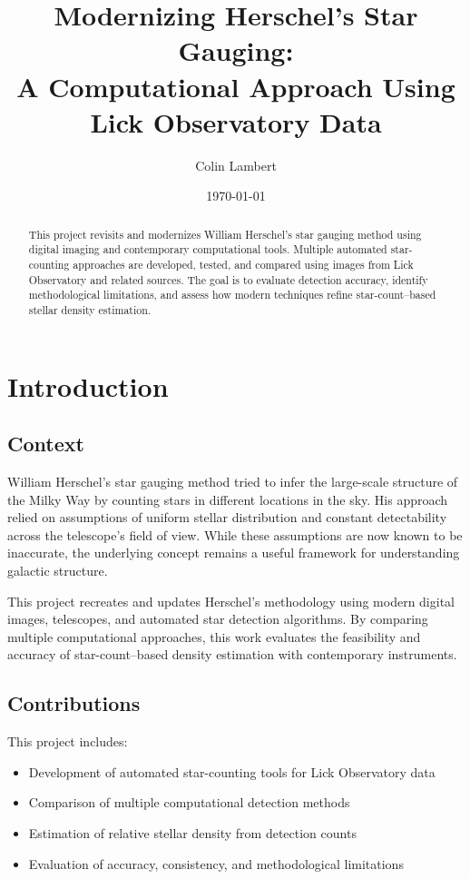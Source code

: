 \documentclass[12pt]{article}
\title{Modernizing Herschel's Star Gauging:\\
A Computational Approach Using Lick Observatory Data}
\author{Colin Lambert}
\date{\today}
\begin{document}
\maketitle

\begin{abstract}
This project revisits and modernizes William Herschel's star gauging method using digital imaging and contemporary computational tools. Multiple automated star-counting approaches are developed, tested, and compared using images from Lick Observatory and related sources. The goal is to evaluate detection accuracy, identify methodological limitations, and assess how modern techniques refine star-count--based stellar density estimation.
\end{abstract}

\section{Introduction}

\subsection{Context}
William Herschel’s star gauging method tried to infer the large-scale structure of the Milky Way by counting stars in different locations in the sky. His approach relied on assumptions of uniform stellar distribution and constant detectability across the telescope's field of view. While these assumptions are now known to be inaccurate, the underlying concept remains a useful framework for understanding galactic structure.

This project recreates and updates Herschel's methodology using modern digital images, telescopes, and automated star detection algorithms. By comparing multiple computational approaches, this work evaluates the feasibility and accuracy of star-count--based density estimation with contemporary instruments.

\subsection{Contributions}
This project includes:
\begin{itemize}
    \item Development of automated star-counting tools for Lick Observatory data
    \item Comparison of multiple computational detection methods
    \item Estimation of relative stellar density from detection counts
    \item Evaluation of accuracy, consistency, and methodological limitations
\end{itemize}
\end{document}
